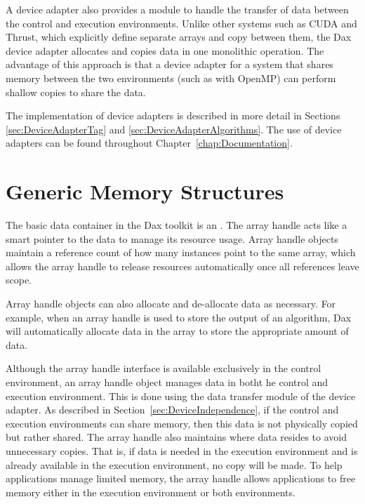 A device adapter also provides a module to handle the transfer of data
between the control and execution environments. Unlike other systems such
as CUDA and Thrust, which explicitly define separate arrays and copy
between them, the Dax device adapter allocates and copies data in one
monolithic operation. The advantage of this approach is that a device
adapter for a system that shares memory between the two environments (such
as with OpenMP) can perform shallow copies to share the data.

The implementation of device adapters is described in more detail in
Sections \ref{sec:DeviceAdapterTag} and
\ref{sec:DeviceAdapterAlgorithms}. The use of device adapters can be found
throughout Chapter~\ref{chap:Documentation}.



\section{Generic Memory Structures}
\label{sec:GenericMemoryStructures}


The basic data container in the Dax toolkit is an . The array handle acts like a smart pointer to the data to manage
its resource usage. Array handle objects maintain a reference count of how
many instances point to the same array, which allows the array handle to
release resources automatically once all references leave scope.

Array handle objects can also allocate and de-allocate data as
necessary. For example, when an array handle is used to store the output of
an algorithm, Dax will automatically allocate data in the array to store
the appropriate amount of data.

Although the array handle interface is available exclusively in the control
environment, an array handle object manages data in botht he control and
execution environment. This is done using the data transfer module of the
device adapter.  As described in
Section~\ref{sec:DeviceIndependence}, if the control and execution
environments can share memory, then this data is not physically copied but
rather shared. The array handle also maintains where data resides to avoid
unnecessary copies. That is, if data is needed in the execution environment
and is already available in the execution environment, no copy will be
made. To help applications manage limited memory, the array handle allows
applications to free memory either in the execution environment or both
environments.

